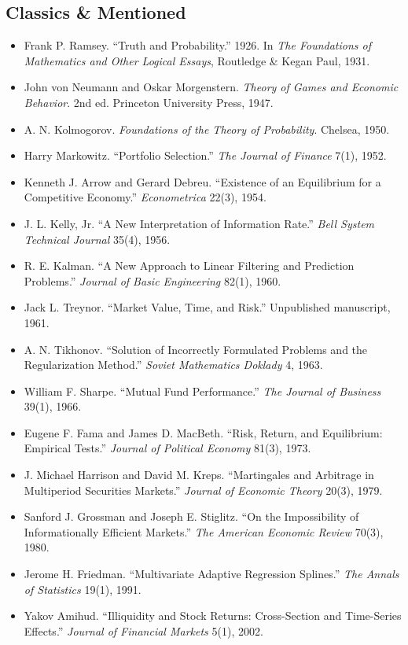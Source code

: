\documentclass{article}
\begin{document}
\subsection{Classics \& Mentioned}
\begin{itemize}
	\item Frank P. Ramsey. ``Truth and Probability.'' 1926. In \textit{The Foundations of Mathematics and Other Logical Essays}, Routledge \& Kegan Paul, 1931.
	\item John von Neumann and Oskar Morgenstern. \textit{Theory of Games and Economic Behavior}. 2nd ed. Princeton University Press, 1947.
	\item A. N. Kolmogorov. \textit{Foundations of the Theory of Probability}. Chelsea, 1950.
	\item Harry Markowitz. ``Portfolio Selection.'' \textit{The Journal of Finance} 7(1), 1952.
	\item Kenneth J. Arrow and Gerard Debreu. ``Existence of an Equilibrium for a Competitive Economy.'' \textit{Econometrica} 22(3), 1954.
	\item J. L. Kelly, Jr. ``A New Interpretation of Information Rate.'' \textit{Bell System Technical Journal} 35(4), 1956.
	\item R. E. Kalman. ``A New Approach to Linear Filtering and Prediction Problems.'' \textit{Journal of Basic Engineering} 82(1), 1960.
	\item Jack L. Treynor. ``Market Value, Time, and Risk.'' Unpublished manuscript, 1961.
	\item A. N. Tikhonov. ``Solution of Incorrectly Formulated Problems and the Regularization Method.'' \textit{Soviet Mathematics Doklady} 4, 1963.
	\item William F. Sharpe. ``Mutual Fund Performance.'' \textit{The Journal of Business} 39(1), 1966.
	\item Eugene F. Fama and James D. MacBeth. ``Risk, Return, and Equilibrium: Empirical Tests.'' \textit{Journal of Political Economy} 81(3), 1973.
	\item J. Michael Harrison and David M. Kreps. ``Martingales and Arbitrage in Multiperiod Securities Markets.'' \textit{Journal of Economic Theory} 20(3), 1979.
	\item Sanford J. Grossman and Joseph E. Stiglitz. ``On the Impossibility of Informationally Efficient Markets.'' \textit{The American Economic Review} 70(3), 1980.
	\item Jerome H. Friedman. ``Multivariate Adaptive Regression Splines.'' \textit{The Annals of Statistics} 19(1), 1991.
	\item Yakov Amihud. ``Illiquidity and Stock Returns: Cross-Section and Time-Series Effects.'' \textit{Journal of Financial Markets} 5(1), 2002.
\end{itemize}
\end{document}
